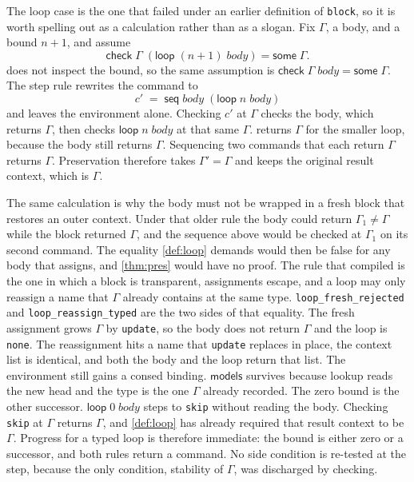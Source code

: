 \documentclass[a4paper,UKenglish,anonymous,cleveref,autoref]{lipics-v2021}
\begin{document}
The loop case is the one that failed under an earlier definition of \texttt{block}, so it is worth spelling out as a calculation rather than as a slogan.
Fix \(\Gamma\), a body, and a bound \(n{+}1\), and assume
\[
\mathsf{check}\;\Gamma\;(\mathsf{loop}\;(n{+}1)\;\mathit{body}) = \mathsf{some}\;\Gamma.
\]
 does not inspect the bound, so the same assumption is \(\mathsf{check}\;\Gamma\;\mathit{body} = \mathsf{some}\;\Gamma\).
The step rule rewrites the command to
\[
c' \;=\; \mathsf{seq}\;\mathit{body}\;(\mathsf{loop}\;n\;\mathit{body})
\]
and leaves the environment alone.
Checking \(c'\) at \(\Gamma\) checks the body, which returns \(\Gamma\), then checks \(\mathsf{loop}\;n\;\mathit{body}\) at that same \(\Gamma\).
 returns \(\Gamma\) for the smaller loop, because the body still returns \(\Gamma\).
Sequencing two commands that each return \(\Gamma\) returns \(\Gamma\).
Preservation therefore takes \(\Gamma' = \Gamma\) and keeps the original result context, which is \(\Gamma\).

The same calculation is why the body must not be wrapped in a fresh block that restores an outer context.
Under that older rule the body could return \(\Gamma_1 \neq \Gamma\) while the block returned \(\Gamma\), and the sequence above would be checked at \(\Gamma_1\) on its second command.
The equality \cref{def:loop} demands would then be false for any body that assigns, and \cref{thm:pres} would have no proof.
The rule that compiled is the one in which a block is transparent, assignments escape, and a loop may only reassign a name that \(\Gamma\) already contains at the same type.
\texttt{loop\_fresh\_rejected} and \texttt{loop\_reassign\_typed} are the two sides of that equality.
The fresh assignment grows \(\Gamma\) by \texttt{update}, so the body does not return \(\Gamma\) and the loop is \texttt{none}.
The reassignment hits a name that \texttt{update} replaces in place, the context list is identical, and both the body and the loop return that list.
The environment still gains a consed binding.
\(\mathsf{models}\) survives because lookup reads the new head and the type is the one \(\Gamma\) already recorded.
The zero bound is the other successor.
\(\mathsf{loop}\;0\;\mathit{body}\) steps to \texttt{skip} without reading the body.
Checking \texttt{skip} at \(\Gamma\) returns \(\Gamma\), and \cref{def:loop} has already required that result context to be \(\Gamma\).
Progress for a typed loop is therefore immediate: the bound is either zero or a successor, and both rules return a command.
No side condition is re-tested at the step, because the only condition, stability of \(\Gamma\), was discharged by checking.
\end{document}
